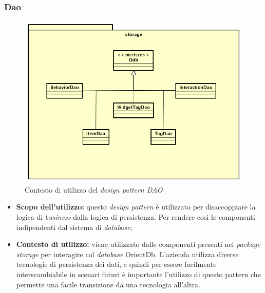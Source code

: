 \subsubsection{Dao}
\begin{figure}[h]
\centering
\includegraphics[scale=0.20]{immagini/storage}
\caption{Contesto di utilizzo del \emph{design pattern DAO}}
\label{fig:pattern-dao}
\end{figure}
\begin{itemize}
\item\textbf{Scopo dell'utilizzo:} questo \emph{design pattern} è utilizzato per disaccoppiare la logica di \emph{business} dalla logica di persistenza. Per rendere così le componenti indipendenti dal sistema di \emph{database};
\item \textbf{Contesto di utilizzo:} viene utilizzato dalle componenti presenti nel \emph{package storage} per interagire col \emph{database} OrientDb. L'azienda utilizza diverse tecnologie di persistenza dei dati, e quindi per essere facilmente interscambiabile in scenari futuri è importante l'utilizzo di questo pattern che permette una facile transizione da una tecnologia all'altra.
\end{itemize}
